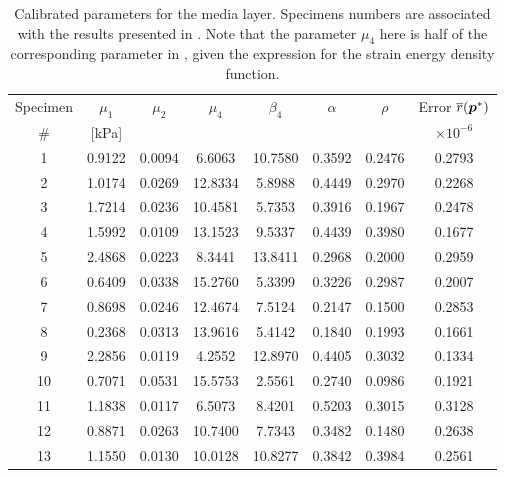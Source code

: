 \begin{table}[ht!]
\caption[Calibrated parameters for the media layer.]{Calibrated parameters for the media layer. Specimens numbers are associated with the results presented in \cite{holzapfel2005determination}. Note that the parameter $\mu_4$ here is half of the corresponding parameter in \cite{holzapfel2005determination}, given the expression for the strain energy density function.}
\label{tab:cal-par-det-med}
\begin{center}
    \begin{tabular}{|c |c| c| c| c| c| c| c|} 
 \hline
 \quad Specimen \quad & \quad $\mu_1$ \quad & \quad $\mu_2$ \quad & \quad $\mu_4$ \quad & \quad $\beta_4$ \quad & \quad $\alpha$ \quad & \quad $\rho$ \quad & Error $\overline{r}(\boldsymbol{p}^*)$ \quad \\
 \quad \# \quad & [kPa] \quad & \quad [kPa] \quad & \quad [kPa] \quad & \quad [--] \quad & \quad [rad] \quad & \quad [--] \quad & $\times 10^{-6}$ \quad \\
 \cline{1-8}
    1 & 0.9122 & 0.0094  & 6.6063  & 10.7580 & 0.3592 & 0.2476 & 0.2793\\
    2 & 1.0174 & 0.0269  & 12.8334  & 5.8988 & 0.4449 & 0.2970 & 0.2268\\
    3 & 1.7214 & 0.0236  & 10.4581  & 5.7353 & 0.3916 & 0.1967 & 0.2478\\
    4 & 1.5992 & 0.0109  &  13.1523 & 9.5337 & 0.4439 & 0.3980 & 0.1677\\
    5 & 2.4868 & 0.0223  & 8.3441  & 13.8411 & 0.2968 & 0.2000 & 0.2959\\
    6 & 0.6409 & 0.0338  & 15.2760  & 5.3399 & 0.3226 & 0.2987 & 0.2007\\
    7 & 0.8698 & 0.0246  & 12.4674  & 7.5124 & 0.2147 & 0.1500 & 0.2853\\
    8 & 0.2368 & 0.0313  &  13.9616 & 5.4142 & 0.1840 & 0.1993 & 0.1661\\
    9 & 2.2856 & 0.0119  &  4.2552  & 12.8970 & 0.4405 & 0.3032 & 0.1334\\
    10 & 0.7071 & 0.0531 & 15.5753 & 2.5561 & 0.2740 & 0.0986 & 0.1921\\
    11 & 1.1838 & 0.0117 & 6.5073 & 8.4201 & 0.5203 & 0.3015 & 0.3128\\
    12 & 0.8871 & 0.0263 & 10.7400 & 7.7343 & 0.3482 & 0.1480 & 0.2638\\
    13 & 1.1550 & 0.0130 & 10.0128 & 10.8277 & 0.3842 & 0.3984 & 0.2561\\
 \hline
\end{tabular}
\end{center}
\end{table}

